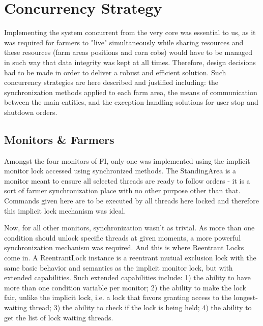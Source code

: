 \documentclass[12pt]{article}
\begin{document}
\newpage
\section{Concurrency Strategy} %

Implementing the system concurrent from the very core was essential to us, as it was required for farmers to "live" simultaneously while sharing resources and 
these resources (farm areas positions and corn cobs) would have to be managed in such way that data integrity was kept at all times.
Therefore, design decisions had to be made in order to deliver a robust and efficient solution.
Such concurrency strategies are here described and justified including: the synchronization methods applied to each farm area, the means of communication between
the main entities, and the exception handling solutions for user stop and shutdown orders.

\subsection{Monitors \& Farmers} \label{monitors} %

Amongst the four monitors of FI, only one was implemented using the implicit monitor lock accessed using synchronized methods.
The StandingArea is a monitor meant to ensure all selected threads are ready to follow orders - it is a sort of farmer synchronization place with no other purpose 
other than that.
Commands given here are to be executed by all threads here locked and therefore this implicit lock mechanism was ideal.

Now, for all other monitors, synchronization wasn't as trivial.
As more than one condition should unlock specific threads at given moments, a more powerful synchronization mechanism was required.
And this is where Reentrant Locks come in.
A ReentrantLock \cite{reentrantlock} instance is a reentrant mutual exclusion lock with the same basic behavior and semantics as the implicit monitor lock, 
but with extended capabilities.
Such extended capabilities include: 1) the ability to have more than one condition variable per monitor; 2) the ability to make the lock fair, unlike the 
implicit lock, i.e. a lock that favors granting access to the longest-waiting thread; 3) the ability to check if the lock is being held; 4) the ability to get 
the list of lock waiting threads.
\end{document}
